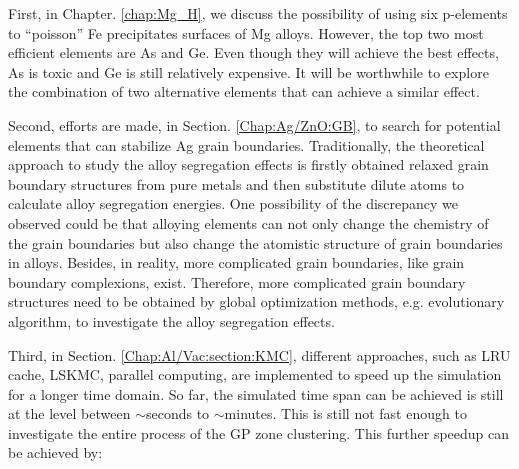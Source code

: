 First, in Chapter. \ref{chap:Mg_H}, we discuss the possibility of using six p-elements to ``poisson'' Fe precipitates surfaces of Mg alloys. However, the top two most efficient elements are As and Ge. Even though they will achieve the best effects, As is toxic and Ge is still relatively expensive. It will be worthwhile to explore the combination of two alternative elements that can achieve a similar effect.

Second, efforts are made, in Section. \ref{Chap:Ag/ZnO:GB}, to search for potential elements that can stabilize Ag grain boundaries. Traditionally, the theoretical approach to study the alloy segregation effects is firstly obtained relaxed grain boundary structures from pure metals and then substitute dilute atoms to calculate alloy segregation energies. One possibility of the discrepancy we observed could be that alloying elements can not only change the chemistry of the grain boundaries but also change the atomistic structure of grain boundaries in alloys. Besides, in reality, more complicated grain boundaries, like grain boundary complexions, exist. \cite{cantwell2014grain} Therefore, more complicated grain boundary structures need to be obtained by global optimization methods, e.g. evolutionary algorithm, to investigate the alloy segregation effects.

Third, in Section. \ref{Chap:Al/Vac:section:KMC}, different approaches, such as \ac{LRU} cache, \ac{LSKMC}, parallel computing, are implemented to speed up the simulation for a longer time domain. So far, the simulated time span can be achieved is still at the level between $\sim$seconds to $\sim$minutes. This is still not fast enough to investigate the entire process of the \ac{GP} zone clustering. This further speedup can be achieved by:

